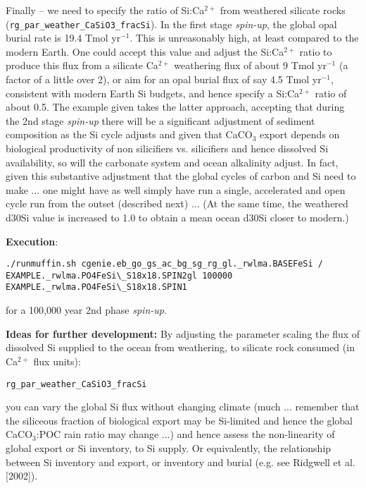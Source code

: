 \documentclass[10pt,twoside]{article}
\begin{document}
\begin{compactenum}
\item Finally -- we need to specify the ratio of Si:Ca\(^{2+}\) from weathered silicate rocks (\texttt{rg\_par\_weather\_CaSiO3\_fracSi}). In the first stage \textit{spin-up}, the global opal burial rate is 19.4 Tmol yr\(^{-1}\). This is unreasonably high, at least compared  to the modern Earth. One could accept this value and adjust the Si:Ca\(^{2+}\) ratio to produce this flux from a silicate Ca\(^{2+}\) weathering flux of about 9 Tmol yr\(^{-1}\) (a factor of a little over 2), or aim for an opal burial flux of say 4.5 Tmol yr\(^{-1}\), consistent with modern Earth Si budgets, and hence specify a Si:Ca\(^{2+}\) ratio of about 0.5. The example given takes the latter approach, accepting that during the 2nd stage \textit{spin-up} there will be a significant adjustment of sediment composition as the Si cycle adjusts and given that CaCO\(_{3}\) export depends on biological productivity of non silicifiers vs. silicifiers and hence dissolved Si availability, so will the carbonate system and ocean alkalinity adjust. In fact, given this substantive adjustment that the global cycles of carbon and Si need to make ... one might have as well simply have run a single, accelerated and open cycle run from the outset (described next) ... (At the same time, the weathered d30Si value is increased to 1.0 to obtain a mean ocean d30Si closer to modern.)

\end{compactenum}

\noindent \textbf{Execution}:
\vspace{-5pt}\begin{verbatim}./runmuffin.sh cgenie.eb_go_gs_ac_bg_sg_rg_gl._rwlma.BASEFeSi /
EXAMPLE._rwlma.PO4FeSi\_S18x18.SPIN2gl 100000 EXAMPLE._rwlma.PO4FeSi\_S18x18.SPIN1\end{verbatim}\vspace{-5pt}
for a 100,000 year 2nd phase \textit{spin-up}.

\noindent \textbf{Ideas for further development:} By adjusting the parameter scaling the flux of dissolved Si supplied to the ocean from weathering, to silicate rock consumed (in Ca\(^{2+}\) flux units):
\vspace{-10pt}\begin{verbatim}rg_par_weather_CaSiO3_fracSi\end{verbatim}\vspace{-10pt}
you can vary the global Si flux without changing climate (much ... remember that the siliceous fraction of biological export may be Si-limited and hence the global CaCO\(_{3}\):POC rain ratio may change ...) and hence assess the non-linearity of global export or Si inventory, to Si supply. Or equivalently, the relationship between Si inventory and export, or inventory and burial (e.g. see Ridgwell et al. [2002]).
\end{document}
